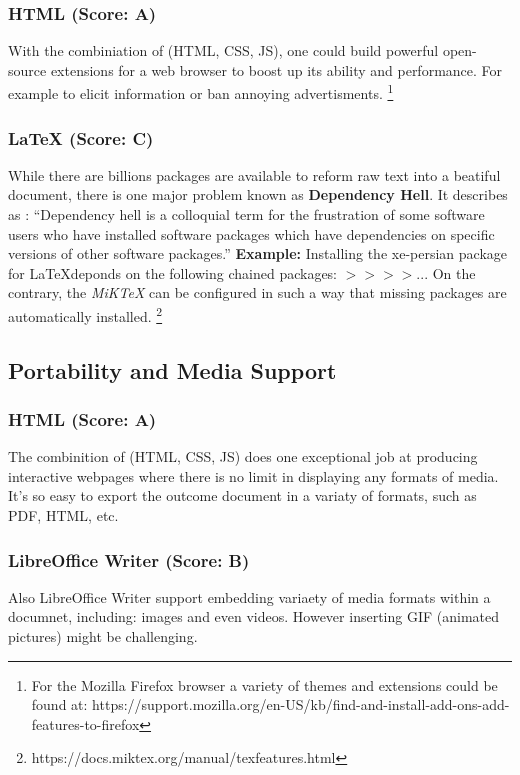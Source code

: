 \documentclass[twocolumn]{article}
\begin{document}
\subsubsection{HTML (Score: A)}
With the combiniation of (HTML, CSS, JS), one could build powerful open-source
extensions for a web browser to boost up its ability and performance. For
example to elicit information or ban annoying advertisments.
\footnote{For the Mozilla Firefox browser a variety of themes and extensions
could be found at:
https://support.mozilla.org/en-US/kb/find-and-install-add-ons-add-features-to-firefox}
\subsubsection{LaTeX (Score: C)}
While there are billions packages are available to reform raw text into a
beatiful document, there is one major problem known as \textbf{Dependency Hell}.
It describes as :
\newline
``Dependency hell is a colloquial term for the frustration of some software
users who have installed software packages which have dependencies on specific
versions of other software packages.''
\newline
\textbf{Example:} Installing the xe-persian package for \LaTeX deponds on the
following chained packages:
\newline
$> > > > ...$
\newline
On the contrary, the \textit{MiKTeX} can be configured in such a way that
missing packages are automatically installed.
\footnote{https://docs.miktex.org/manual/texfeatures.html}
\subsection{Portability and Media Support}
\subsubsection{HTML (Score: A)}
The combinition of (HTML, CSS, JS) does one exceptional job at producing
interactive webpages where there is no limit in displaying any formats of media.
It's so easy to export the outcome document in a variaty of formats, such as
PDF, HTML, etc.
\newline
\subsubsection{LibreOffice Writer (Score: B)}
Also LibreOffice Writer support embedding variaety of media formats within a
documnet, including: images and even videos. However inserting GIF (animated
pictures) might be challenging.
\end{document}
